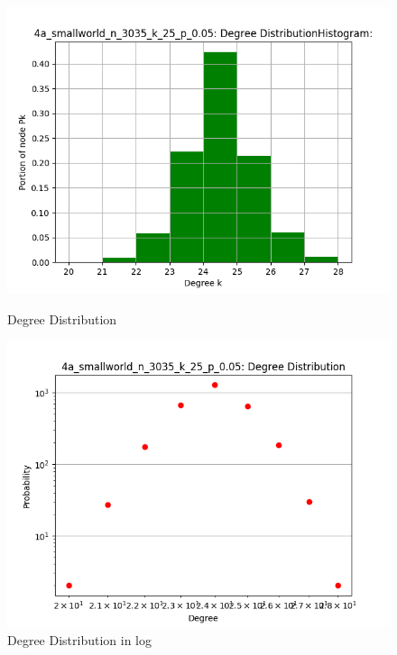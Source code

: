 \documentclass[runningheads]{llncs}
\begin{document}
\begin{figure}
    \centering
    \begin{minipage}{0.5\textwidth}
        \centering
        \includegraphics[width=\textwidth]{4b_sw_dedist}
        \caption{Degree Distribution}
        \label{fig_4b_sw_degreedist_hist}
    \end{minipage}\hfill
    \begin{minipage}{0.5\textwidth}
        \centering
        \includegraphics[width=\textwidth]{4b_sw_dedist_log}
        \caption{Degree Distribution in log}
        \label{fig_4b_sw_degreedist_log}
    \end{minipage}
\end{figure}
\end{document}

